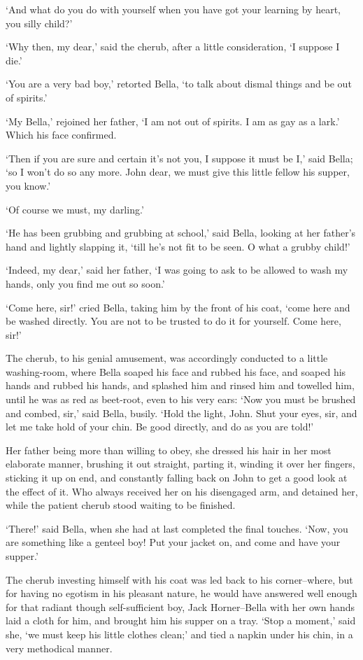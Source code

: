 ‘And what do you do with yourself when you have got your learning by
heart, you silly child?’

‘Why then, my dear,’ said the cherub, after a little consideration, ‘I
suppose I die.’

‘You are a very bad boy,’ retorted Bella, ‘to talk about dismal things
and be out of spirits.’

‘My Bella,’ rejoined her father, ‘I am not out of spirits. I am as gay
as a lark.’ Which his face confirmed.

‘Then if you are sure and certain it’s not you, I suppose it must be
I,’ said Bella; ‘so I won’t do so any more. John dear, we must give this
little fellow his supper, you know.’

‘Of course we must, my darling.’

‘He has been grubbing and grubbing at school,’ said Bella, looking at
her father’s hand and lightly slapping it, ‘till he’s not fit to be
seen. O what a grubby child!’

‘Indeed, my dear,’ said her father, ‘I was going to ask to be allowed to
wash my hands, only you find me out so soon.’

‘Come here, sir!’ cried Bella, taking him by the front of his coat,
‘come here and be washed directly. You are not to be trusted to do it
for yourself. Come here, sir!’

The cherub, to his genial amusement, was accordingly conducted to a
little washing-room, where Bella soaped his face and rubbed his face,
and soaped his hands and rubbed his hands, and splashed him and rinsed
him and towelled him, until he was as red as beet-root, even to his very
ears: ‘Now you must be brushed and combed, sir,’ said Bella, busily.
‘Hold the light, John. Shut your eyes, sir, and let me take hold of your
chin. Be good directly, and do as you are told!’

Her father being more than willing to obey, she dressed his hair in her
most elaborate manner, brushing it out straight, parting it, winding it
over her fingers, sticking it up on end, and constantly falling back on
John to get a good look at the effect of it. Who always received her
on his disengaged arm, and detained her, while the patient cherub stood
waiting to be finished.

‘There!’ said Bella, when she had at last completed the final touches.
‘Now, you are something like a genteel boy! Put your jacket on, and come
and have your supper.’

The cherub investing himself with his coat was led back to his
corner--where, but for having no egotism in his pleasant nature, he
would have answered well enough for that radiant though self-sufficient
boy, Jack Horner--Bella with her own hands laid a cloth for him, and
brought him his supper on a tray. ‘Stop a moment,’ said she, ‘we must
keep his little clothes clean;’ and tied a napkin under his chin, in a
very methodical manner.

